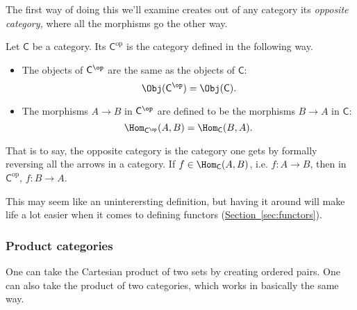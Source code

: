\documentclass[notes.tex]{subfiles}
\begin{document}
The first way of doing this we'll examine creates out of any category its \emph{opposite category,} where all the morphisms go the other way.

\begin{definition}
  \label{def:oppositecategory}
  Let $\mathsf{C}$ be a category. Its  $\mathsf{C}^{\mathrm{op}}$ is the category defined in the following way.
  \begin{itemize}
    \item The objects of $\mathsf{C}^{\op}$ are the same as the objects of $\mathsf{C}$:
      \begin{equation*}
        \Obj(\mathsf{C}^{\op}) = \Obj(\mathsf{\mathsf{C}}).
      \end{equation*}

    \item The morphisms $A \to B$ in $\mathsf{C}^{\op}$ are defined to be the morphisms $B \to A$ in $\mathsf{C}$:
      \begin{equation*}
        \Hom_{\mathsf{C}^{\op}}(A, B) = \Hom_{\mathsf{C}}(B, A).
      \end{equation*}
  \end{itemize}

  That is to say, the opposite category is the category one gets by formally reversing all the arrows in a category. If $f \in \Hom_{\mathsf{C}}(A, B)$, i.e. $f \colon A \to B$, then in $\mathsf{C}^{\mathrm{op}}$, $f\colon B \to A$.
\end{definition}

This may seem like an uninterersting definition, but having it around will make life a lot easier when it comes to defining functors (\hyperref[sec:functors]{Section~\ref*{sec:functors}}).


\subsubsection{Product categories}

One can take the Cartesian product of two sets by creating ordered pairs. One can also take the product of two categories, which works in basically the same way.
\end{document}
